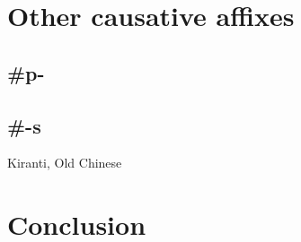 \documentclass[oldfontcommands,oneside,a4paper,11pt]{article}
\begin{document}
\section{Other causative affixes}
\subsection{\#p-}
\citet{jacques15causative}
\citet{jackson14morpho}
\citet{jackson06paisheng}
\citet{lai13affixale}


\citet{delancey15adjectival}
\subsection{\#-s}
Kiranti, Old Chinese
\citet{michailovsky85dental}
\citet{jacques15derivational.khaling}
\section{Conclusion}
 


\end{document}
